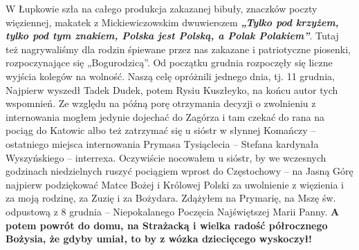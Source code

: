 W Łupkowie szła na całego produkcja zakazanej bibuły, znaczków poczty więziennej, makatek z Mickiewiczowskim dwuwierszem \textbf{\textit{„Tylko pod krzyżem, tylko pod tym znakiem, Polska jest Polską, a Polak Polakiem”}}. Tutaj też nagrywaliśmy dla rodzin śpiewane przez nas zakazane i patriotyczne piosenki, rozpoczynające się „Bogurodzicą”. Od początku grudnia rozpoczęły się liczne wyjścia kolegów na wolność. Naszą celę opróżnili jednego dnia, tj. 11 grudnia, Najpierw wyszedł Tadek Dudek, potem Rysiu Kuszłeyko, na końcu autor tych wspomnień. Ze względu na późną porę otrzymania decyzji o zwolnieniu z internowania mogłem jedynie dojechać do Zagórza i tam czekać do rana na pociąg do Katowic albo też zatrzymać się u sióstr w słynnej Komańczy – ostatniego miejsca internowania Prymasa Tysiąclecia – Stefana kardynała Wyszyńskiego – interrexa. Oczywiście nocowałem u sióstr, by we wczesnych godzinach niedzielnych ruszyć pociągiem wprost do Częstochowy – na Jasną Górę najpierw podziękować Matce Bożej i Królowej Polski za uwolnienie z więzienia i za moją rodzinę, za Zuzię i za Bożydara. Zdążyłem na Prymarię, na Mszę św. odpustową z 8 grudnia – Niepokalanego Poczęcia Najświętszej Marii Panny. \textbf{A potem powrót do domu, na Strażacką i wielka radość półrocznego Bożysia, że gdyby umiał, to by z wózka dziecięcego wyskoczył!}

